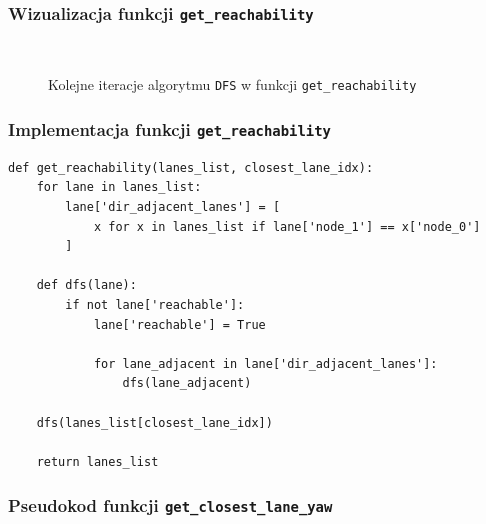 \subsubsection{Wizualizacja funkcji \texttt{get\_reachability}}

\begin{figure}[H]
    \centering
    
    
    \\[-2ex]
    
    
    \caption{Kolejne iteracje algorytmu \texttt{DFS} w funkcji \texttt{get\_reachability}}
\end{figure}

\newpage

\subsubsection{Implementacja funkcji \texttt{get\_reachability}}

\begin{verbatim}
def get_reachability(lanes_list, closest_lane_idx):
    for lane in lanes_list:
        lane['dir_adjacent_lanes'] = [
            x for x in lanes_list if lane['node_1'] == x['node_0']
        ]

    def dfs(lane):
        if not lane['reachable']:
            lane['reachable'] = True

            for lane_adjacent in lane['dir_adjacent_lanes']:
                dfs(lane_adjacent)

    dfs(lanes_list[closest_lane_idx])

    return lanes_list
\end{verbatim}

\subsubsection{Pseudokod funkcji \texttt{get\_closest\_lane\_yaw}}


